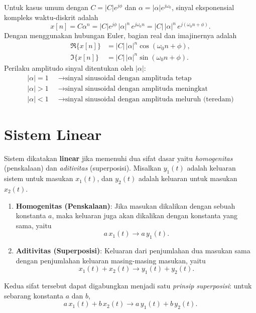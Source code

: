 Untuk kasus umum dengan $C = |C|e^{j\phi}$ dan $\alpha = |\alpha|e^{j\omega_0}$, sinyal eksponensial kompleks waktu-diskrit adalah
\begin{equation}
x[n] = C\alpha^n = |C|e^{j\phi}\,|\alpha|^n\,e^{j\omega_0 n} = |C|\,|\alpha|^n\,e^{j({\omega_0 n+\phi})}.
\end{equation}
Dengan menggunakan hubungan Euler, bagian real dan imajinernya adalah
\begin{align}
\Re\{x[n]\} &= |C|\,|\alpha|^n\cos(\omega_0 n + \phi),\\
\Im\{x[n]\} &= |C|\,|\alpha|^n\sin(\omega_0 n + \phi).
\end{align}
Perilaku amplitudo sinyal ditentukan oleh $|\alpha|$:
\begin{align*}
|\alpha| = 1 \;\;&\rightarrow \text{sinyal sinusoidal dengan amplituda tetap}\\
|\alpha| > 1 \;\;&\rightarrow \text{sinyal sinusoidal dengan amplituda meningkat}\\
|\alpha| < 1 \;\;&\rightarrow \text{sinyal sinusoidal dengan amplituda meluruh (teredam)}
\end{align*}


\section{Sistem Linear}

Sistem dikatakan \textbf{linear} jika memenuhi dua sifat dasar yaitu \textit{homogenitas} (penskalaan) dan \textit{aditivitas} (superposisi). Misalkan $y_1(t)$ adalah keluaran sistem untuk masukan $x_1(t)$, dan $y_2(t)$ adalah keluaran untuk masukan $x_2(t)$.

\begin{enumerate}
\item \textbf{Homogenitas (Penskalaan)}: Jika masukan dikalikan dengan sebuah konstanta $a$, maka keluaran juga akan dikalikan dengan konstanta yang sama, yaitu
\[
a\,x_1(t) \longrightarrow a\,y_1(t).
\]

\item \textbf{Aditivitas (Superposisi)}: Keluaran dari penjumlahan dua masukan sama dengan penjumlahan keluaran masing-masing masukan, yaitu
\[
x_1(t) + x_2(t) \longrightarrow y_1(t) + y_2(t).
\]
\end{enumerate}

Kedua sifat tersebut dapat digabungkan menjadi satu \textit{prinsip superposisi}: untuk sebarang konstanta $a$ dan $b$,
\begin{equation}
a\,x_1(t) + b\,x_2(t) \longrightarrow a\,y_1(t) + b\,y_2(t).
\label{eq:superposisi}
\end{equation}

